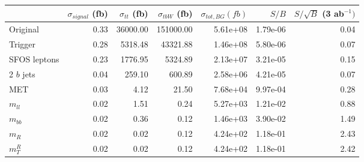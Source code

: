 \begin{tabular}{lrrrrrr}
\toprule
{} &  $\sigma_{signal}$ (fb) &  $\sigma_{tt}$ (fb) &  $\sigma_{tbW}$ (fb) &  $\sigma_{tot, BG} (fb)$ &     $S/B$ &  $S/\sqrt{B}$ (3 ab$^{-1})$ \\
\midrule
Original     &                    0.33 &            36000.00 &            151000.00 &                 5.61e+08 &  1.79e-06 &                        0.04 \\
Trigger      &                    0.28 &             5318.48 &             43321.88 &                 1.46e+08 &  5.80e-06 &                        0.07 \\
SFOS leptons &                    0.23 &             1776.95 &              5324.89 &                 2.13e+07 &  3.21e-05 &                        0.15 \\
2 $b$ jets   &                    0.04 &              259.10 &               600.89 &                 2.58e+06 &  4.21e-05 &                        0.07 \\
MET          &                    0.03 &                4.12 &                21.50 &                 7.68e+04 &  9.97e-04 &                        0.28 \\
$m_{ll}$     &                    0.02 &                1.51 &                 0.24 &                 5.27e+03 &  1.21e-02 &                        0.88 \\
$m_{bb}$     &                    0.02 &                0.36 &                 0.12 &                 1.46e+03 &  3.90e-02 &                        1.49 \\
$m_{R}$      &                    0.02 &                0.02 &                 0.12 &                 4.24e+02 &  1.18e-01 &                        2.43 \\
$m_{T}^{R}$  &                    0.02 &                0.02 &                 0.12 &                 4.24e+02 &  1.18e-01 &                        2.42 \\
\bottomrule
\end{tabular}
